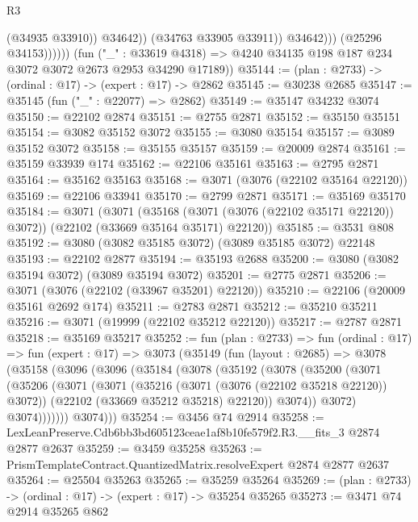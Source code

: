 \begin{lexlean}{R3}
\begin{coremodule}
                              (@34935 @33910))
                            @34642))
                        (@34763 @33905 @33911))
                      @34642)))
                (@25296 @34153))))))
      (fun ("_" : @33619 @4318) =>
      @4240 @34135 @198 @187 @234 @3072 @3072 @2673 @2953 @34290 @17189))
@35144 := (plan : @2733) -> (ordinal : @17) -> (expert : @17) -> @2862
@35145 := @30238 @2685
@35147 := @35145 (fun ("_" : @22077) => @2862)
@35149 := @35147 @34232 @3074
@35150 := @22102 @2874
@35151 := @2755 @2871
@35152 := @35150 @35151
@35154 := @3082 @35152 @3072
@35155 := @3080 @35154
@35157 := @3089 @35152 @3072
@35158 := @35155 @35157
@35159 := @20009 @2874
@35161 := @35159 @33939 @174
@35162 := @22106 @35161
@35163 := @2795 @2871
@35164 := @35162 @35163
@35168 := @3071 (@3076 (@22102 @35164 @22120))
@35169 := @22106 @33941
@35170 := @2799 @2871
@35171 := @35169 @35170
@35184 := @3071
    (@3071
      (@35168 (@3071 (@3076 (@22102 @35171 @22120)) @3072))
      (@22102 (@33669 @35164 @35171) @22120))
@35185 := @3531 @808
@35192 := @3080 (@3082 @35185 @3072) (@3089 @35185 @3072) @22148
@35193 := @22102 @2877
@35194 := @35193 @2688
@35200 := @3080 (@3082 @35194 @3072) (@3089 @35194 @3072)
@35201 := @2775 @2871
@35206 := @3071 (@3076 (@22102 (@33967 @35201) @22120))
@35210 := @22106 (@20009 @35161 @2692 @174)
@35211 := @2783 @2871
@35212 := @35210 @35211
@35216 := @3071 (@19999 (@22102 @35212 @22120))
@35217 := @2787 @2871
@35218 := @35169 @35217
@35252 := fun (plan : @2733) =>
  fun (ordinal : @17) =>
  fun (expert : @17) =>
  @3073
    (@35149
      (fun (layout : @2685) =>
      @3078
        (@35158
          (@3096
            (@3096
              (@35184
                (@3078
                  (@35192
                    (@3078
                      (@35200
                        (@3071
                          (@35206
                            (@3071
                              (@3071
                                (@35216 (@3071 (@3076 (@22102 @35218 @22120)) @3072))
                                (@22102 (@33669 @35212 @35218) @22120))
                              @3074))
                          @3072)
                        @3074)))))))
          @3074)))
@35254 := @3456 @74 @2914
@35258 := LexLeanPreserve.Cdb6bb3bd605123ceae1af8b10fe579f2.R3.__fits_3 @2874 @2877 @2637
@35259 := @3459 @35258
@35263 := PrismTemplateContract.QuantizedMatrix.resolveExpert @2874 @2877 @2637
@35264 := @25504 @35263
@35265 := @35259 @35264
@35269 := (plan : @2733) -> (ordinal : @17) -> (expert : @17) -> @35254 @35265
@35273 := @3471 @74 @2914 @35265 @862

\end{coremodule}
\end{lexlean}
